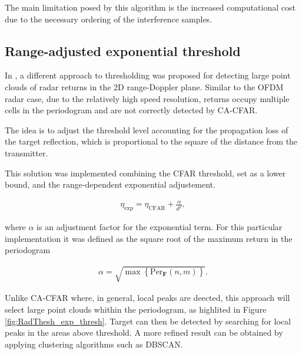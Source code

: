 The main limitation posed by this algorithm is the increased computational cost due to the necessary ordering of the interference samples.


\subsection{Range-adjusted exponential threshold}

	
	In \cite{Wagner_Feger_Stelzer_2017}, a different approach to thresholding was proposed for detecting large point clouds of radar returns in the 2D range-Doppler plane. Similar to the OFDM radar case, due to the relatively high speed resolution, returns occupy multiple cells in the periodogram and are not correctly detected by CA-CFAR.
	
	The idea is to adjust the threshold level accounting for the propagation loss of the target reflection, which is proportional to the square of the distance from the transmitter. 
	
	This solution was implemented combining the CFAR threshold, set as a lower bound, and the range-dependent exponential adjustement.
	
	\begin{align*}
		\eta_{\text{exp}} = \eta_{\text{CFAR}} + \frac{\alpha}{d^2},
	\end{align*} 
	
	where $\alpha$ is an adjustment factor for the exponential term. For this particular implementation it was defined as the square root of the maximum return in the periodogram
	
	\begin{align*}
		\alpha = \sqrt{\max{ \left\{\text{Per}_{\bm{F}}(n,m)\right\} }}.
	\end{align*}
	
	Unlike CA-CFAR where, in general, local peaks are deected, this approach will select large point clouds whithin the periodogram, as highlited in Figure \ref{fig:RadThesh_exp_thresh}.
	Target can then be detected by searching for local peaks in the areas above threshold. A more refined result can be obtained by applying clustering algorithms such as DBSCAN.
	
